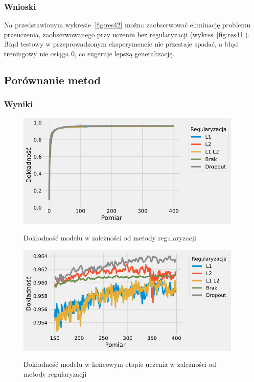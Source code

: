 \documentclass{article}
\begin{document}
\subsubsection*{Wnioski}
Na przedstawionym wykresie~\ref{fig:res42} można zaobserwować eliminację problemu przeuczenia, zaobserwowanego przy uczeniu bez regularyzacji (wykres~\ref{fig:res41}). Błąd testowy w przeprowadzonym eksperymencie nie przestaje spadać, a błąd treningowy nie osiąga 0, co sugeruje lepszą generalizację.

\newpage
\subsection{Porównanie metod}
\subsubsection*{Wyniki}
\begin{figure}[H]
	\centering
	\caption{Dokładność modelu w zależności od metody regularyzacji}
	\includegraphics[width=\textwidth]{reg_acc.png}
	\label{fig:res51}
\end{figure}
\begin{figure}[H]
	\centering
	\caption{Dokładność modelu w końcowym etapie uczenia w zależności od metody regularyzacji}
	\includegraphics[width=\textwidth]{reg_acc_zoom.png}
	\label{fig:res52}
\end{figure}
\end{document}

